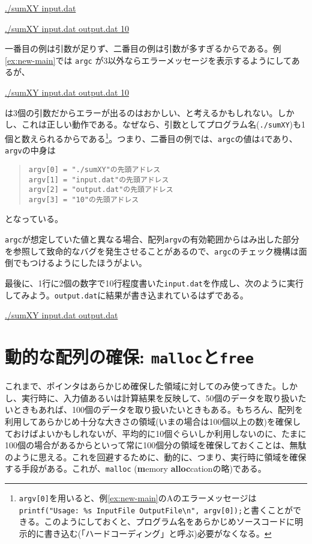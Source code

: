 \begin{commandline2}
    \prompt \underline{./sumXY input.dat}
\end{commandline2} \noindent
\begin{commandline2}
    \prompt \underline{./sumXY input.dat output.dat 10}
\end{commandline2} \noindent
一番目の例は引数が足りず、二番目の例は引数が多すぎるからである。例\ref{ex:new-main}では \texttt{argc} が3以外ならエラーメッセージを表示するようにしてあるが、
\begin{commandline2}
    \prompt \underline{./sumXY input.dat output.dat 10}
\end{commandline2} \noindent
は3個の引数だからエラーが出るのはおかしい、と考えるかもしれない。しかし、これは正しい動作である。なぜなら、引数としてプログラム名(\texttt{./sumXY})も1個と数えられるからである\footnote{\texttt{argv[0]}を用いると、例\ref{ex:new-main}のAのエラーメッセージは \texttt{printf("Usage: \%s InputFile OutputFile\textbackslash n", argv[0]);}と書くことができる。このようにしておくと、プログラム名をあらかじめソースコードに明示的に書き込む(「ハードコーディング」と呼ぶ)必要がなくなる。}。つまり、二番目の例では、\texttt{argc}の値は4であり、\texttt{argv}の中身は
\begin{quote}
    \begin{verbatim}
argv[0] = "./sumXY"の先頭アドレス
argv[1] = "input.dat"の先頭アドレス
argv[2] = "output.dat"の先頭アドレス
argv[3] = "10"の先頭アドレス
\end{verbatim}
\end{quote}
となっている。

\texttt{argc}が想定していた値と異なる場合、配列\texttt{argv}の有効範囲からはみ出した部分を参照して致命的なバグを発生させることがあるので、\texttt{argc}のチェック機構は面倒でもつけるようにしたほうがよい。

最後に、1行に2個の数字で10行程度書いた\texttt{input.dat}を作成し、次のように実行してみよう。\texttt{output.dat}に結果が書き込まれているはずである。
\begin{commandline2}
    \prompt \underline{./sumXY input.dat output.dat}
\end{commandline2}

\section{動的な配列の確保: \texttt{malloc}と\texttt{free}}
\label{sec:clang:malloc}

これまで、ポインタはあらかじめ確保した領域に対してのみ使ってきた。しかし、実行時に、入力値あるいは計算結果を反映して、50個のデータを取り扱いたいときもあれば、100個のデータを取り扱いたいときもある。もちろん、配列を利用してあらかじめ十分な大きさの領域(いまの場合は100個以上の数)を確保しておけばよいかもしれないが、平均的に10個ぐらいしか利用しないのに、たまに100個の場合があるからといって常に100個分の領域を確保しておくことは、無駄のように思える。これを回避するために、動的に、つまり、実行時に領域を確保する手段がある。これが、\texttt{malloc} (\textbf{m}emory \textbf{alloc}cationの略)である。

